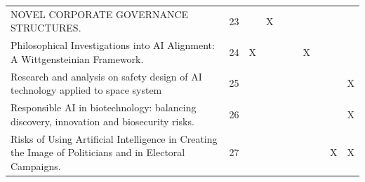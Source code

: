 \begin{landscape}
\begin{longtable}{|p{17cm}|c|c|c|c|c|c|c|c|c|}
		NOVEL CORPORATE GOVERNANCE STRUCTURES.                                                                                                                  & 23          &                                    & X                                                         &                                                       &                                                            &                                           &                                              &                                                    &                                    \\
		Philosophical Investigations into AI Alignment: A Wittgensteinian Framework.                                                                            & 24          & X                                  &                                                           &                                                       &                                                            & X                                         &                                              &                                                    &                                    \\
		Research and analysis on safety design of AI technology applied to space system                                                                         & 25          &                                    &                                                           &                                                       &                                                            &                                           &                                              &                                                    & X                                  \\
		Responsible AI in biotechnology: balancing discovery, innovation and biosecurity risks.                                                                 & 26          &                                    &                                                           &                                                       &                                                            &                                           &                                              &                                                    & X                                  \\
		Risks of Using Artificial Intelligence in Creating the Image of Politicians and in Electoral Campaigns.                                                 & 27          &                                    &                                                           &                                                       &                                                            &                                           &                                              & X                                                  & X                                  \\

\end{longtable}
\end{landscape}
